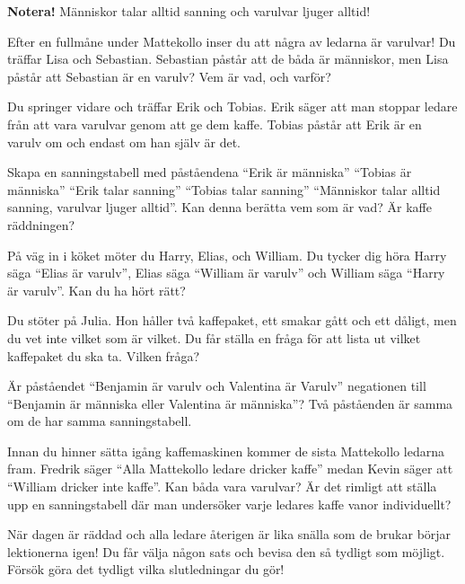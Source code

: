\noindent
\textbf{Notera!}  Människor talar alltid sanning och varulvar ljuger alltid!

\begin{problem}
	Efter en fullmåne under Mattekollo inser du att några av ledarna är varulvar! Du träffar Lisa och Sebastian. Sebastian påstår att de båda är människor, men Lisa påstår att Sebastian är en varulv? Vem är vad, och varför?
\end{problem}

\begin{problem}
	Du springer vidare och träffar Erik och Tobias. Erik säger att man stoppar ledare från att vara varulvar genom att ge dem kaffe. Tobias påstår att Erik är en varulv om och endast om han själv är det.

	Skapa en sanningstabell med påståendena ``Erik är människa'' ``Tobias är människa'' ``Erik talar sanning'' ``Tobias talar sanning'' ``Människor talar alltid sanning, varulvar ljuger alltid''. Kan denna berätta vem som är vad? Är kaffe räddningen?
\end{problem}

\begin{problem}
	På väg in i köket möter du Harry, Elias, och William. Du tycker dig höra Harry säga ``Elias är varulv'', Elias säga ``William är varulv'' och William säga ``Harry är varulv''. Kan du ha hört rätt?
\end{problem}

\begin{problem}[Extra]
	Du stöter på Julia. Hon håller två kaffepaket, ett smakar gått och ett dåligt, men du vet inte vilket som är vilket. Du får ställa en fråga för att lista ut vilket kaffepaket du ska ta. Vilken fråga?
\end{problem}

\begin{problem}
	Är påståendet ``Benjamin är varulv och Valentina är Varulv'' negationen till ``Benjamin är människa eller Valentina är människa''? Två påståenden är samma om de har samma sanningstabell.
\end{problem}

\begin{problem}
	Innan du hinner sätta igång kaffemaskinen kommer de sista Mattekollo ledarna fram. Fredrik säger ``Alla Mattekollo ledare dricker kaffe'' medan Kevin säger att ``William dricker inte kaffe''. Kan båda vara varulvar? Är det rimligt att ställa upp en sanningstabell där man undersöker varje ledares kaffe vanor individuellt?
\end{problem}

\begin{problem}[Extra]
	När dagen är räddad och alla ledare återigen är lika snälla som de brukar börjar lektionerna igen! Du får välja någon sats och bevisa den så tydligt som möjligt. Försök göra det tydligt vilka slutledningar du gör!
\end{problem}
